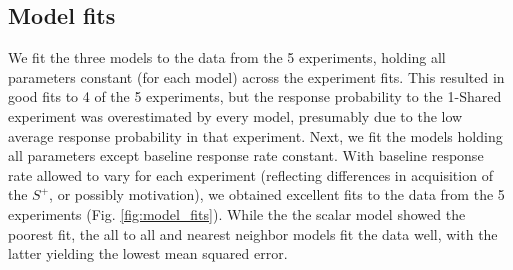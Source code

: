 \subsection{Model fits}
We fit the three models to the data from the 5 experiments, holding all parameters constant (for each model) across the experiment fits.  
This resulted in good fits to 4 of the 5 experiments, but the response probability to the 1-Shared experiment was overestimated by every model, presumably due to the low average response probability in that experiment.  
Next, we fit the models holding all parameters except baseline response rate constant.  
With baseline response rate allowed to vary for each experiment (reflecting differences in acquisition of the $S^+$, or possibly motivation), we obtained excellent fits to the data from the 5 experiments (Fig. \ref{fig:model_fits}).  
While the the scalar model showed the poorest fit, the all to all and nearest neighbor models fit the data well, with the latter yielding the lowest mean squared error.  